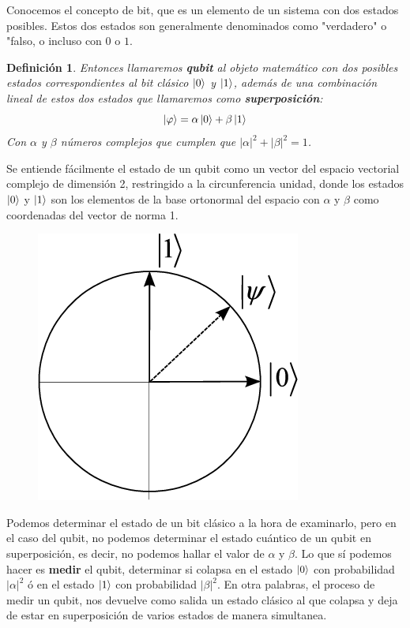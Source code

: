 \documentclass[a4paper]{article}
\newtheorem{deff}{Definición}[section]
\numberwithin{equation}{section}
\begin{document}
Conocemos el concepto de bit, que es un elemento de un sistema con dos estados posibles. Estos dos estados son generalmente denominados como "verdadero" o "falso, o incluso con $0$ o $1$.
\begin{deff}Entonces llamaremos \textbf{qubit} al objeto matemático con dos posibles estados correspondientes al bit clásico $\ket{0}$ y $\ket{1}$, además de una combinación lineal de estos dos estados que llamaremos como \textbf{superposición}:
\begin{equation}
\ket{\varphi} = \alpha\ket{0} + \beta\ket{1}
\end{equation}
Con $\alpha$ y $\beta$ números complejos que cumplen que $|\alpha|^2 + |\beta|^2 = 1$.
\end{deff}
Se entiende fácilmente el estado de un qubit como un vector del espacio vectorial complejo de dimensión 2, restringido a la circunferencia unidad, donde los estados $\ket{0}$ y $\ket{1}$ son los elementos de la base ortonormal del espacio con $\alpha$ y $\beta$ como coordenadas del vector de norma 1.
\begin{figure}[h]
	\centering
	\includegraphics[scale=.3]{qubit_vector}
\end{figure}
Podemos determinar el estado de un bit clásico a la hora de examinarlo, pero en el caso del qubit, no podemos determinar el estado cuántico de un qubit en superposición, es decir, no podemos hallar el valor de $\alpha$ y $\beta$. Lo que sí podemos hacer es \textbf{medir} el qubit, determinar si colapsa en el estado $\ket{0}$ con probabilidad $|\alpha|^2$ ó en el estado $\ket{1}$ con probabilidad $|\beta|^2$. En otra palabras, el proceso de medir un qubit, nos devuelve como salida un estado clásico al que colapsa y deja de estar en superposición de varios estados de manera simultanea.\\
\end{document}

